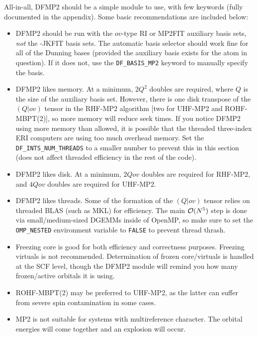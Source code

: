 All-in-all, DFMP2 should be a simple module to use, with few keywords (fully
documented in the appendix). Some basic recommendations are included below:
\begin{itemize}
\item DFMP2 should be run with the $ov$-type RI or MP2FIT auxiliary basis sets,
\emph{not} the -JKFIT basis sets. The automatic basis selector should work fine for
all of the Dunning bases (provided the auxiliary basis exists for the atom in
question). If it does not, use the \texttt{DF\_BASIS\_MP2} keyword to manually
specify the basis. 
\item DFMP2 likes memory. At a minimum, $2Q^2$ doubles are required, where $Q$ is
the size of the auxiliary basis set. However, there is one disk transpose of the
$(Q|ov)$ tensor in the RHF-MP2 algorithm [two for UHF-MP2 and ROHF-MBPT(2)], so more
memory will reduce seek times. If you notice DFMP2 using more memory than
allowed, it is possible that the threaded three-index ERI computers are using
too much overhead memory. Set the \texttt{DF\_INTS\_NUM\_THREADS} to a smaller
number to prevent this in this section (does not affect threaded efficiency in
the rest of the code). 
\item DFMP2 likes disk. At a minimum, $2Qov$ doubles are required for RHF-MP2,
and $4Qov$ doubles are required for UHF-MP2. 
\item DFMP2 likes threads. Some of the formation of the $(Q|ov)$ tensor relies
on threaded BLAS (such as MKL) for efficiency. The main ${\cal O}(N^5)$ step is
done via small/medium-sized DGEMMs inside of OpenMP, so make sure to set the
\texttt{OMP\_NESTED} environment variable to \texttt{FALSE} to prevent thread
thrash.
\item Freezing core is good for both efficiency and correctness purposes.
Freezing virtuals is not recommended. Determination of frozen core/virtuals is
handled at the SCF level, though the DFMP2 module will remind you how many
frozen/active orbitals it is using. 
\item ROHF-MBPT(2) may be preferred to UHF-MP2, as the latter can suffer from
severe spin contamination in some cases.
\item MP2 is not suitable for systems with multireference character. The
orbital energies will come together and an explosion will occur. 
\end{itemize}  

